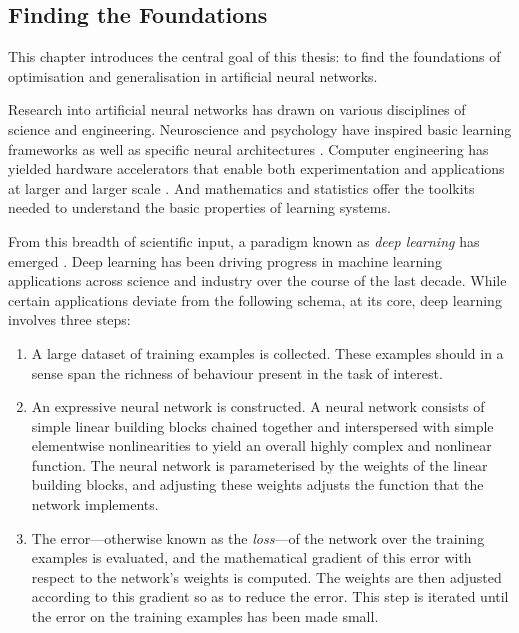 \begin{refsection}

\chapter{Finding the Foundations}

\begin{tcolorbox}
This chapter introduces the central goal of this thesis: to find the foundations of optimisation and generalisation in artificial neural networks.
\end{tcolorbox}

Research into artificial neural networks has drawn on various disciplines of science and engineering. Neuroscience and psychology have inspired basic learning frameworks \citep{Sutton1998} as well as specific neural architectures \citep{Fukushima2004NeocognitronAS}. Computer engineering has yielded hardware accelerators that enable both experimentation and applications at larger and larger scale \citep{steinkrau}. And mathematics and statistics offer the toolkits needed to understand the basic properties of learning systems. 

From this breadth of scientific input, a paradigm known as \textit{deep learning} has emerged \citep{SCHMIDHUBER201585,deeplearning}. Deep learning has been driving progress in machine learning applications across science and industry over the course of the last decade. While certain applications deviate from the following schema, at its core, deep learning involves three steps:
\begin{enumerate}
    \item A large dataset of training examples is collected. These examples should in a sense span the richness of behaviour present in the task of interest.
    \item An expressive neural network is constructed. A neural network consists of simple linear building blocks chained together and interspersed with simple elementwise nonlinearities to yield an overall highly complex and nonlinear function. The neural network is parameterised by the weights of the linear building blocks, and adjusting these weights adjusts the function that the network implements.
    \item The error---otherwise known as the \textit{loss}---of the network over the training examples is evaluated, and the mathematical gradient of this error with respect to the network's weights is computed. The weights are then adjusted according to this gradient so as to reduce the error. This step is iterated until the error on the training examples has been made small. 
\end{enumerate}


\end{refsection}
